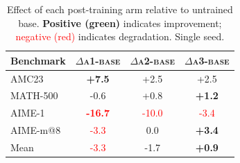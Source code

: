 \begin{table}[t]
\centering
\small
\caption{Effect of each post-training arm relative to untrained base. \textbf{Positive (green)} indicates improvement; \textcolor{red}{negative (red)} indicates degradation. Single seed.}
\label{tab:delta_vs_base}
\begin{tabular}{lccc}
\toprule
Benchmark & $\Delta$\textsc{a1}{-}\textsc{base} & $\Delta$\textsc{a2}{-}\textsc{base} & $\Delta$\textsc{a3}{-}\textsc{base} \\
\midrule
AMC23     & \textbf{+7.5} & +2.5 & +2.5 \\
MATH-500  & {-0.6} & +0.8 & \textbf{+1.2} \\
AIME-1    & \textcolor{red}{\textbf{-16.7}} & \textcolor{red}{-10.0} & \textcolor{red}{-3.4} \\
AIME-m@8  & \textcolor{red}{-3.3} & 0.0 & \textbf{+3.4} \\
\midrule
Mean      & \textcolor{red}{-3.3} & -1.7 & \textbf{+0.9} \\
\bottomrule
\end{tabular}
\end{table}

